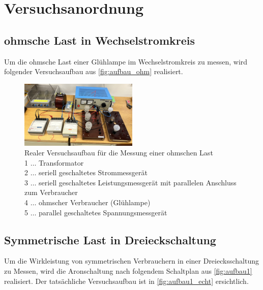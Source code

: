 \documentclass[12pt,english,ngerman]{scrartcl}
\begin{document}

\section{Versuchsanordnung}
\label{sec:versuchsanordnung}

\subsection{ohmsche Last in Wechselstromkreis}

Um die ohmsche Last einer Glühlampe im Wechselstromkreis zu messen, wird folgender Versuchsaufbau aus \autoref{fig:aufbau_ohm} realisiert.

\begin{figure}[H]
	\begin{center}
		\includegraphics[width = 0.5\textwidth]{./figures/aufbau_ohm.png}
	\end{center}
	\caption[Realer Versuchsaufbau für die Messung einer ohmschen Last]
	{Realer Versuchsaufbau für die Messung einer ohmschen Last \\
	1 \(\dots\) Transformator  \\
	2 \(\dots\) seriell geschaltetes Strommessgerät  \\
	3 \(\dots\) seriell geschaltetes Leistungsmessgerät mit parallelen Anschluss zum Verbraucher  \\
	4 \(\dots\) ohmscher Verbraucher (Glühlampe)  \\
	5 \(\dots\) parallel geschaltetes Spannungsmessgerät
	}\label{fig:aufbau_ohm}
\end{figure}


\subsection{Symmetrische Last in Dreieckschaltung}

Um die Wirkleistung von symmetrischen Verbrauchern in einer Dreiecksschaltung zu Messen, wird die Aronschaltung
nach folgendem Schaltplan aus \autoref{fig:aufbau1} realisiert. 
Der tatsächliche Versuchsaufbau ist in \autoref{fig:aufbau1_echt} ersichtlich.
\end{document}
